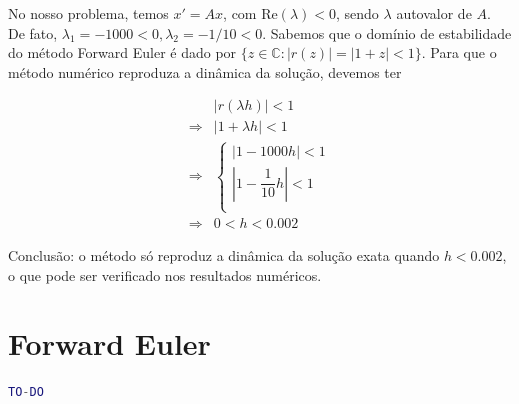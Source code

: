 \documentclass{article}
\begin{document}
\begin{enumerate}
\begin{enumerate}
                No nosso problema, temos $x' = Ax$, com $\text{Re}(\lambda) < 0$,
                sendo $\lambda$ autovalor de $A$. De fato,
                $\lambda_1 = -1000 < 0, \lambda_2 = -1/10 < 0$.
                Sabemos que o domínio de estabilidade do método
                Forward Euler é dado por
                $\{z \in \mathbb{C} : |r(z)| = |1 + z| < 1\}$. Para que o método
                numérico reproduza a dinâmica da solução, devemos ter

                \begin{align*}
                    &|r(\lambda h)| < 1 \\
                    \Rightarrow &|1 + \lambda h| < 1 \\
                    \Rightarrow &\begin{cases}
                        |1 -1000 h| < 1 \\
                        \left|1 - \dfrac{1}{10} h\right| < 1 \\
                    \end{cases} \\
                    \Rightarrow &0 < h < 0.002
                \end{align*}
                
                Conclusão: o método só reproduz a dinâmica da solução
                exata quando $h < 0.002$, o que pode ser verificado nos
                resultados numéricos.

            \end{enumerate} 
    \end{enumerate}

    \clearpage

    \appendix

    \section{Forward Euler}
        \label{appendix:forward_euler}

        \begin{lstlisting}[language=Matlab]
            TO-DO
        \end{lstlisting}
\end{document}
